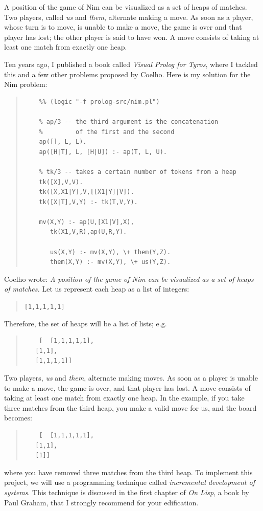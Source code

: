 \documentclass[a4paper,12pt]{book}
\begin{document}
A position of the game of Nim can be visualized as a set of
heaps of matches. Two players, called {\em us} and {\em them},
alternate making a move. As soon as a player, whose turn is to
move, is unable to make a move, the game is over and that player
has lost; the other player is said to have won. A move consists
of taking at least one match from exactly one heap.

Ten years ago, I published a book called {\em Visual Prolog for
Tyros}, where I tackled this and a few other problems proposed
by Coelho. Here is my solution for the Nim problem:
\begin{quote}
	\begin{verbatim}
	%% (logic "-f prolog-src/nim.pl")

	% ap/3 -- the third argument is the concatenation
	%         of the first and the second
	ap([], L, L).
	ap([H|T], L, [H|U]) :- ap(T, L, U).

	% tk/3 -- takes a certain number of tokens from a heap
	tk([X],V,V).
	tk([X,X1|Y],V,[[X1|Y]|V]).
	tk([X|T],V,Y) :- tk(T,V,Y).

	mv(X,Y) :- ap(U,[X1|V],X),
       tk(X1,V,R),ap(U,R,Y).

       us(X,Y) :- mv(X,Y), \+ them(Y,Z).
       them(X,Y) :- mv(X,Y), \+ us(Y,Z).
	\end{verbatim}
\end{quote}
Coelho wrote: {\em A position of the game of Nim can be
visualized as a set of heaps of matches.} Let us represent
each heap as a list of integers:
\begin{quote}
	\verb|[1,1,1,1,1]|
\end{quote}
Therefore, the set of heaps will be a list of lists; e.g.
\begin{quote}
	\begin{verbatim}
	[  [1,1,1,1,1],
   [1,1],
   [1,1,1,1]]
	\end{verbatim}
\end{quote}

Two players, {\em us} and {\em them}, alternate making
moves. As soon as a player is unable to make a move,
the game is over, and that player has lost. A move consists
of taking at least one match from exactly one heap. In the
example, if you take three matches from the third heap,
you make a valid move for us, and the board becomes:
\begin{quote}
	\begin{verbatim}
	[  [1,1,1,1,1],
   [1,1],
   [1]]
	\end{verbatim}
\end{quote}
where you have removed three matches from the third heap.
To implement this project, we will use a programming
technique called {\em incremental development of systems}.
This technique is discussed in the first chapter of
{\em On Lisp}, a book by Paul Graham, that I strongly
recommend for your edification. 
\end{document}
